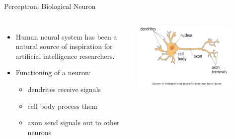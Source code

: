 \documentclass[aspectratio=169,14pt,usenames,dvipsnames]{beamer}
\begin{document}
\begin{frame}{Perceptron: Biological Neuron}
\begin{columns}

\begin{itemize}
  \item Human neural system has been a natural source of inspiration for artificial intelligence researchers. 
  \item Functioning of a neuron:  
  	\begin{itemize}
		\item dendrites receive signals
		\item cell body process them
		\item axon send signals out to other neurons
	\end{itemize}
\end{itemize}
\includegraphics[width=0.8\textwidth, height=0.6\textheight]{Images/AIML_Percep_IMG2.png}
\end{columns}
\end{frame}
\end{document}
